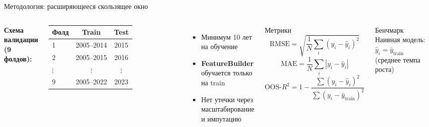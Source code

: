 \documentclass[aspectratio=169,10pt]{beamer}
\begin{document}
\begin{frame}{Методология: расширяющееся скользящее окно}
\begin{columns}[T]
\textbf{Схема валидации (9 фолдов):}
\medskip

\begin{tabular}{lcc}
\toprule
Фолд & Train & Test \\
\midrule
1 & 2005–2014 & 2015 \\
2 & 2005–2015 & 2016 \\
$\vdots$ & $\vdots$ & $\vdots$ \\
9 & 2005–2022 & 2023 \\
\bottomrule
\end{tabular}
\medskip

\begin{itemize}\setlength\itemsep{4pt}
  \item Минимум 10 лет на обучение
  \item \textbf{FeatureBuilder} обучается только на train
  \item Нет утечки через масштабирование и импутацию
\end{itemize}

\begin{block}{Метрики}
$$\text{RMSE} = \sqrt{\frac{1}{N}\sum_i(y_i - \hat{y}_i)^2}$$
$$\text{MAE} = \frac{1}{N}\sum_i|y_i - \hat{y}_i|$$
$$\text{OOS-}R^2 = 1 - \frac{\sum(y_i-\hat{y}_i)^2}{\sum(y_i-\bar{y}_{\text{train}})^2}$$
\end{block}
\medskip
\begin{alertblock}{Бенчмарк}
Наивная модель: $\hat{y}_i = \bar{y}_{\text{train}}$ (среднее темпа роста)
\end{alertblock}
\end{columns}
\end{frame}
\end{document}
